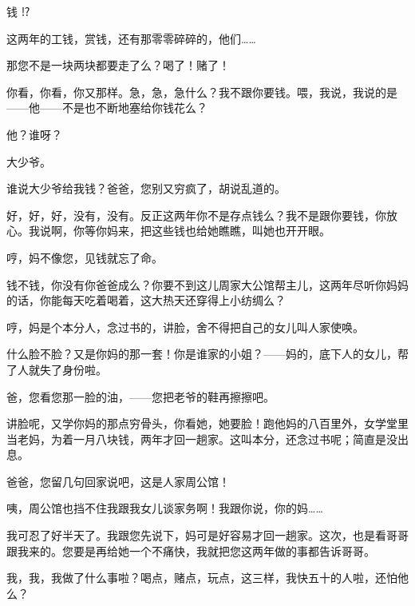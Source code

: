 钱 ⁉

这两年的工钱，赏钱，还有那零零碎碎的，他们……

那您不是一块两块都要走了么？喝了！赌了！

你看，你看，你又那样。急，急，急什么？我不跟你要钱。喂，我说，我说的是——他——不是也不断地塞给你钱花么？

他？谁呀？

大少爷。

谁说大少爷给我钱？爸爸，您别又穷疯了，胡说乱道的。

好，好，好，没有，没有。反正这两年你不是存点钱么？我不是跟你要钱，你放心。我说啊，你等你妈来，把这些钱也给她瞧瞧，叫她也开开眼。

哼，妈不像您，见钱就忘了命。

钱不钱，你没有你爸爸成么？你要不到这儿周家大公馆帮主儿，这两年尽听你妈妈的话，你能每天吃着喝着，这大热天还穿得上小纺绸么？

哼，妈是个本分人，念过书的，讲脸，舍不得把自己的女儿叫人家使唤。

什么脸不脸？又是你妈的那一套！你是谁家的小姐？——妈的，底下人的女儿，帮了人就失了身份啦。

爸，您看您那一脸的油，——您把老爷的鞋再擦擦吧。

讲脸呢，又学你妈的那点穷骨头，你看她，她要脸！跑他妈的八百里外，女学堂里当老妈，为着一月八块钱，两年才回一趟家。这叫本分，还念过书呢；简直是没出息。

爸爸，您留几句回家说吧，这是人家周公馆！

咦，周公馆也挡不住我跟我女儿谈家务啊！我跟你说，你的妈……

我可忍了好半天了。我跟您先说下，妈可是好容易才回一趟家。这次，也是看哥哥跟我来的。您要是再给她一个不痛快，我就把您这两年做的事都告诉哥哥。

我，我，我做了什么事啦？喝点，赌点，玩点，这三样，我快五十的人啦，还怕他么？

